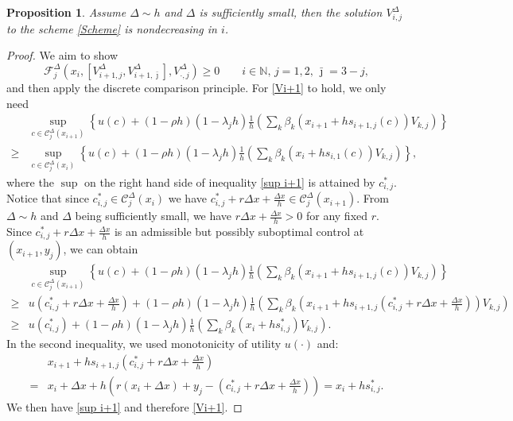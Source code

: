 \documentclass[11pt]{article}
\numberwithin{equation}{section}
\newtheorem{proposition}[theorem]{Proposition}
\theoremstyle{Claim}
\newcommand{\NN}{{\mathbb{N}}}
\newcommand{\mC}{\mathcal C}
\newcommand{\beq}{\begin{equation}}
\newcommand{\eeq}{\end{equation}}
\theoremstyle{plain}
\newcommand{\D}{\Delta}
\begin{document}
\begin{proposition}
Assume $\D\sim h$ and  $\D$ is sufficiently small, then the solution $V^\D_{i,j}$ to the scheme \eqref{Scheme} is nondecreasing in $i$. 
\end{proposition}
\begin{proof}
We aim to show 
\beq\label{Vi+1}
\mathcal{F}^\D_j\left(x_i,\left[V^{\Delta}_{i+1,j},V^{\Delta}_{i+1,\bar \jmath}\right],V^{\Delta}_{\cdot,j}\right)\geq 0\qquad i\in\NN,\,j=1,2,\,\bar{\jmath}=3-j,
\eeq
and then apply the discrete comparison principle. For \cref{Vi+1} to hold, we only need
\beq\label{sup i+1}
\begin{aligned}
&\sup_{c\in \mC^{\D}_{j}(x_{i+1})}\left\{
 u(c)+(1-\rho h)(1-\lambda_jh)\frac{1}{h}\left(\sum_k \beta_k(x_{i+1}+hs_{i+1,j}(c))V_{k,j} \right)\right\}\\
 \geq {}&\sup_{c\in \mC^{\D}_{j}(x_{i})}\left\{
 u(c)+(1-\rho h)(1-\lambda_jh)\frac{1}{h}\left(\sum_k \beta_k(x_i+hs_{i,1}(c))V_{k,j} \right)\right\},
 \end{aligned}
\eeq
where the $\sup$ on the right hand side of inequality \eqref{sup i+1} is attained by  $c^*_{i,j}$. Notice that since $c^*_{i,j}\in \mC^{\D}_{j}(x_{i})$ we have $c^*_{i,j}+r\D x+\frac{\D x}{h}\in \mC^{\D}_{j}(x_{i+1}).$
From $\D\sim h$ and  $\D$ being sufficiently small, we have $r\D x+\frac{\D x}{h}>0$ for any fixed $r$. Since $c^*_{i,j}+r\D x+\frac{\D x}{h}$ is an admissible but possibly suboptimal control at $(x_{i+1},y_j)$, we can obtain
$$
\begin{aligned}
&\sup_{c\in \mC^{\D}_{j}(x_{i+1})}\left\{
 u(c)+(1-\rho h)(1-\lambda_jh)\frac{1}{h}\left(\sum_k \beta_k(x_{i+1}+hs_{i+1,j}(c))V_{k,j} \right)\right\}\\
 \geq {}&
 u\left(c^*_{i,j}+r\D x+\frac{\D x}{h}\right)
+(1-\rho h)(1-\lambda_jh)\frac{1}{h}\left(\sum_k \beta_k\left(x_{i+1}+hs_{i+1,j}\left(c^*_{i,j}+r\D x+\frac{\D x}{h}\right)\right)V_{k,j} \right)\\
 \geq {}&
 u(c^*_{i,j})+(1-\rho h)(1-\lambda_jh)\frac{1}{h}\left(\sum_k  \beta_k(x_{i}+hs_{i,j}^*)V_{k,j} \right).
 \end{aligned}
$$
In the second inequality, we used monotonicity of utility $u(\cdot)$ and:
\begin{align*}
& x_{i+1}+hs_{i+1,j}\left(c^*_{i,j}+r\D x+\frac{\D x}{h}\right)\\
={}&x_i+\D x+h\left(r(x_i+\D x)+y_j-\left(c^*_{i,j}+r\D x+\frac{\D x}{h}\right)\right)=x_i+hs_{i,j}^*.
\end{align*}
We then have \cref{sup i+1} and therefore \cref{Vi+1}.
\end{proof}
\end{document}
